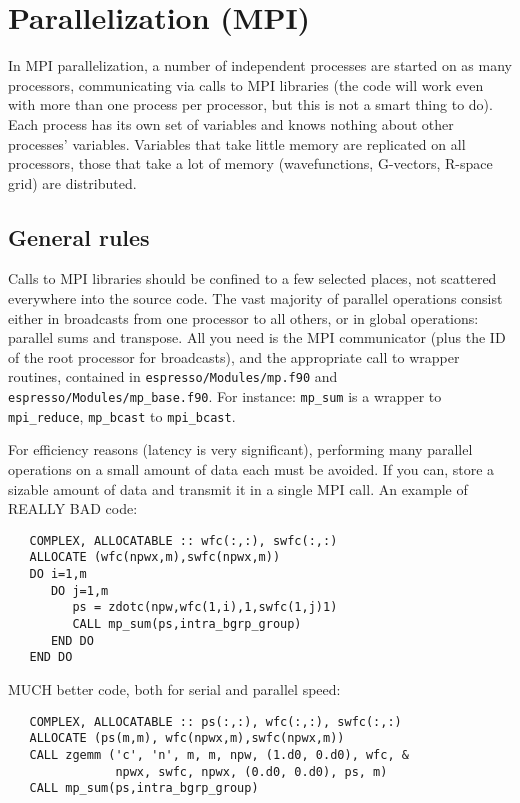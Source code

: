 \documentclass[12pt,a4paper]{article}
\begin{document}
\section{Parallelization (MPI)}

In MPI parallelization, a number of independent processes are started
on as many processors, communicating via calls to MPI libraries
(the code will work even with more than one process per processor,
but this is not a smart thing to do). Each process has its own
set of variables and knows nothing about other processes' variables.
Variables that take little memory are replicated on all processors,
those that take a lot of memory (wavefunctions, G-vectors, R-space grid)
are distributed.

\subsection{General rules}

Calls to MPI libraries should be confined to a few selected places,
not scattered everywhere into the source code. The vast majority
of parallel operations consist either in broadcasts from one processor
to all others, or in global operations: parallel sums and transpose.
All you need is the MPI communicator (plus the ID of the root processor
for broadcasts), and the appropriate call to wrapper routines, contained
in {\tt espresso/Modules/mp.f90} and {\tt espresso/Modules/mp\_base.f90}.
For instance: {\tt mp\_sum} is a wrapper to {\tt mpi\_reduce},
{\tt mp\_bcast} to {\tt mpi\_bcast}.

For efficiency reasons (latency is very significant), performing many
parallel operations on a small amount of data each must be avoided.
If you can, store a sizable amount of data and transmit it in a single
MPI call. An example of REALLY BAD code:
\begin{verbatim}
   COMPLEX, ALLOCATABLE :: wfc(:,:), swfc(:,:)
   ALLOCATE (wfc(npwx,m),swfc(npwx,m))
   DO i=1,m
      DO j=1,m
         ps = zdotc(npw,wfc(1,i),1,swfc(1,j)1)
         CALL mp_sum(ps,intra_bgrp_group)
      END DO
   END DO
\end{verbatim}
MUCH better code, both for serial and parallel speed:
\begin{verbatim}
   COMPLEX, ALLOCATABLE :: ps(:,:), wfc(:,:), swfc(:,:)
   ALLOCATE (ps(m,m), wfc(npwx,m),swfc(npwx,m))
   CALL zgemm ('c', 'n', m, m, npw, (1.d0, 0.d0), wfc, &
               npwx, swfc, npwx, (0.d0, 0.d0), ps, m)
   CALL mp_sum(ps,intra_bgrp_group)
\end{verbatim}
\end{document}
